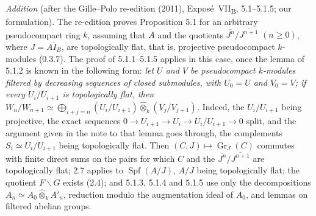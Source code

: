 \medskip
\noindent\emph{Addition} (after the Gille--Polo re-edition (2011),
Expos\'e~VII\textsubscript{B}, 5.1--5.1.5; our formulation). The
re-edition proves Proposition 5.1 for an arbitrary pseudocompact ring
\(k\), assuming that \(A\) and the quotients
\(\overline{J^n}/\overline{J^{n+1}}\) \((n\geq0)\), where
\(J=\overline{AI_B}\), are topologically flat, that is, projective
pseudocompact \(k\)-modules (0.3.7). The proof of 5.1.1--5.1.5 applies
in this case, once the lemma of 5.1.2 is known in the following form:
\emph{let \(U\) and \(V\) be pseudocompact \(k\)-modules filtered by
decreasing sequences of closed submodules, with \(U_0=U\) and
\(V_0=V\); if every \(U_i/U_{i+1}\) is topologically flat, then
\(W_n/W_{n+1}\simeq\bigoplus_{i+j=n}(U_i/U_{i+1})\widehat\otimes_k
(V_j/V_{j+1})\).} Indeed, the \(U_i/U_{i+1}\) being projective, the
exact sequences \(0\to U_{i+1}\to U_i\to U_i/U_{i+1}\to0\) split, and
the argument given in the note to that lemma goes through, the
complements \(S_i\simeq U_i/U_{i+1}\) being topologically flat. Then
\((C,J)\mapsto\operatorname{Gr}_J(C)\) commutes with finite direct sums
on the pairs for which \(C\) and the \(\overline{J^n}/\overline{J^{n+1}}\)
are topologically flat; 2.7 applies to \(\operatorname{Spf}(A/J)\),
\(A/J\) being topologically flat; the quotient \(F\backslash G\) exists
(2.4); and 5.1.3, 5.1.4 and 5.1.5 use only the decompositions
\(A_n\simeq A_0\widehat\otimes_kA'_n\), reduction modulo the augmentation
ideal of \(A_0\), and lemmas on filtered abelian groups.
